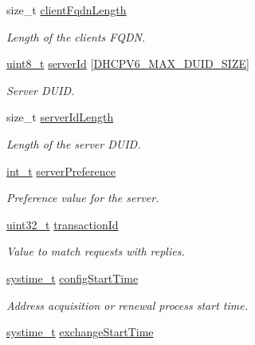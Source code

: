 \begin{DoxyCompactItemize}
size\+\_\+t \hyperlink{struct__Dhcpv6ClientContext_a09a6760038023339ff681e2ce4e9957f}{client\+Fqdn\+Length}
\begin{DoxyCompactList}\small\item\em Length of the client\textquotesingle{}s F\+Q\+DN. \end{DoxyCompactList}\item 
\hyperlink{stdint_8h_aba7bc1797add20fe3efdf37ced1182c5}{uint8\+\_\+t} \hyperlink{struct__Dhcpv6ClientContext_a3862d9f92229ce6ae40edba070cb3633}{server\+Id} \mbox{[}\hyperlink{dhcpv6__common_8h_aa05ad3ad9a83e2486fbb7f86838fffb9}{D\+H\+C\+P\+V6\+\_\+\+M\+A\+X\+\_\+\+D\+U\+I\+D\+\_\+\+S\+I\+ZE}\mbox{]}
\begin{DoxyCompactList}\small\item\em Server D\+U\+ID. \end{DoxyCompactList}\item 
size\+\_\+t \hyperlink{struct__Dhcpv6ClientContext_aa6e5c000d1e73010064b6f8b4b33879e}{server\+Id\+Length}
\begin{DoxyCompactList}\small\item\em Length of the server D\+U\+ID. \end{DoxyCompactList}\item 
\hyperlink{compiler__port_8h_a022c65af7f6c8d3947e8a37d64db6ad6}{int\+\_\+t} \hyperlink{struct__Dhcpv6ClientContext_ae4691ba34b71cec514356c8ca0c25b53}{server\+Preference}
\begin{DoxyCompactList}\small\item\em Preference value for the server. \end{DoxyCompactList}\item 
\hyperlink{stdint_8h_a435d1572bf3f880d55459d9805097f62}{uint32\+\_\+t} \hyperlink{struct__Dhcpv6ClientContext_aeba35c605008ddb9975b40cf96852ace}{transaction\+Id}
\begin{DoxyCompactList}\small\item\em Value to match requests with replies. \end{DoxyCompactList}\item 
\hyperlink{compiler__port_8h_ae3e32a98d431a02106616da3071832dd}{systime\+\_\+t} \hyperlink{struct__Dhcpv6ClientContext_afb96412e382590b9bbf877a7ebfc46f7}{config\+Start\+Time}
\begin{DoxyCompactList}\small\item\em Address acquisition or renewal process start time. \end{DoxyCompactList}\item 
\hyperlink{compiler__port_8h_ae3e32a98d431a02106616da3071832dd}{systime\+\_\+t} \hyperlink{struct__Dhcpv6ClientContext_ac0cae52199afa7b555e7448171b8b675}{exchange\+Start\+Time}

\end{DoxyCompactItemize}
